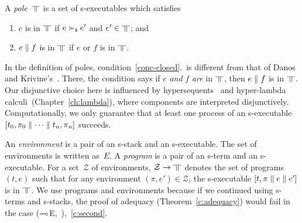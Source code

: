 \begin{definition}
 \label{def:pole}
A \textit{pole}~$\bbot$ is a set of s-executables
which satisfies
\begin{enumerate}
 \item \label{red-closed} $e$ is in $\bbot$ if $e\succ_{\mathsf s} e'$ and
       $e'\in\bbot$; and
 \item \label{conc-closed} $e\parallel f$ is in $\bbot$ if $e$ or $f$ is in $\bbot$.
\end{enumerate}
\end{definition}
In the definition of poles,
condition~\ref{conc-closed}.~is different from that of Danos and Krivine's~\citep{danos-krivine}.
There, the condition says if $e$ \textit{and} $f$ \textit{are} in
$\bbot$, then $e\parallel f$ is in $\bbot$.  Our disjunctive choice here is influenced
by hypersequents~\citep{avron91} and hyper-lambda
calculi~(Chapter~\ref{ch:lambda}), where
components are interpreted disjunctively.
Computationally,
we only guarantee that at least one process of an s-executable
$[t_0,\pi_0\parallel \cdots \parallel t_n,\pi_n]$ succeeds.

An \textit{environment} is a pair of an s-stack and
an s-executable.
The set of environments is written as~$E$.
A \textit{program} is a pair of an s-term and an s-executable.
For a set~$\mathcal Z$ of environments, $\mathcal Z\rightarrow\bbot$ denotes
the set of programs $(t,e)$ such that
for any environment $(\pi,e')\in \mathcal Z$,
the s-executable $[t,\pi\parallel e \parallel e']$ is in $\bbot$.
We use programs and environments because if we continued using
s-terms and s-stacks, the proof of adequacy (Theorem~\ref{c:adequacy})
would fail
in the case
($\multimap$E,~\textminus),~\ref{c:second}.

